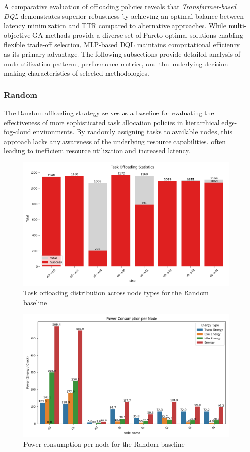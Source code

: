 \documentclass[preprint,3p,authoryear]{elsarticle}
\begin{document}
A comparative evaluation of offloading policies reveals that \emph{Transformer-based DQL} demonstrates superior robustness by achieving an optimal balance between latency minimization and TTR compared to alternative approaches. While multi-objective GA methods provide a diverse set of Pareto-optimal solutions enabling flexible trade-off selection, MLP-based DQL maintains computational efficiency as its primary advantage. The following subsections provide detailed analysis of node utilization patterns, performance metrics, and the underlying decision-making characteristics of selected methodologies.

\subsubsection{Random}
\label{subsec:random}

The Random offloading strategy serves as a baseline for evaluating the effectiveness of more sophisticated task allocation policies in hierarchical edge-fog-cloud environments. By randomly assigning tasks to available nodes, this approach lacks any awareness of the underlying resource capabilities, often leading to inefficient resource utilization and increased latency.

\begin{figure}[H]
    \centering
    \includegraphics[width=0.5\linewidth]{figs/Random/task_offloading_statistics.png}
    \caption{Task offloading distribution across node types for the Random baseline}
    \label{fig:random-task-offloading-stats}
\end{figure}

\begin{figure}[H]
    \centering
    \includegraphics[width=0.5\linewidth]{figs/Random/power_consumption_per_node.png}
    \caption{Power consumption per node for the Random baseline}
    \label{fig:random-power-consumption}
\end{figure}
\end{document}
